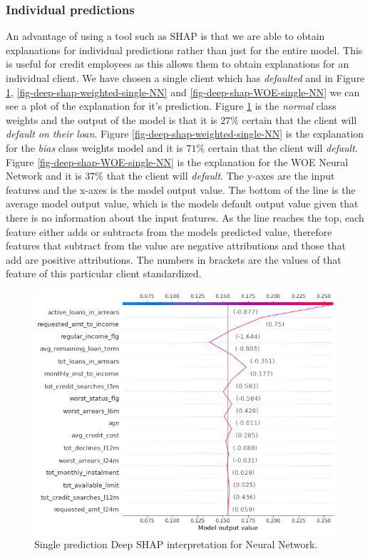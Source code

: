 \subsubsection{Individual predictions}
An advantage of using a tool such as SHAP is that we are able to obtain explanations for individual predictions rather than just for the entire model. This is useful for credit employees as this allows them to obtain explanations for an individual client. We have chosen a single client which has \emph{defaulted} and in Figure \ref{fig-deep-shap-single-NN}, \ref{fig-deep-shap-weighted-single-NN} and \ref{fig-deep-shap-WOE-single-NN} we can see a plot of the explanation for it's prediction. Figure \ref{fig-deep-shap-single-NN} is the \emph{normal} class weights and the output of the model is that it is $27\%$ certain that the client will \emph{default on their loan}. Figure \ref{fig-deep-shap-weighted-single-NN} is the explanation for the \emph{bias} class weights model and it is $71\%$ certain that the client will \emph{default}. Figure \ref{fig-deep-shap-WOE-single-NN} is the explanation for the WOE Neural Network and it is $37\%$ that the client will \emph{default}. The y-axes are the input features and the x-axes is the model output value. The bottom of the line is the average model output value, which is the models default output value given that there is no information about the input features. As the line reaches the top, each feature either adds or subtracts from the models predicted value, therefore features that subtract from the value are negative attributions and those that add are positive attributions. The numbers in brackets are the values of that feature of this particular client standardized.

\begin  {figure}[!htpb]
\centering
  \includegraphics[width=0.8\linewidth]{Credit_Images/shap-nn-single.png}
   \caption{Single prediction Deep SHAP interpretation for Neural Network.}
    \label{fig-deep-shap-single-NN}
\end{figure}


